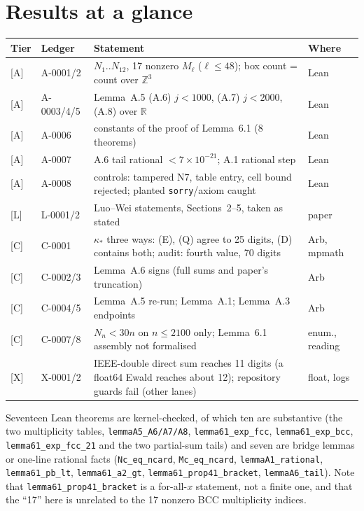 \documentclass[11pt]{article}
\newcommand{\tier}[1]{\textsf{[#1]}}
\newcommand{\tA}{\tier{A}}
\newcommand{\tL}{\tier{L}}
\newcommand{\tC}{\tier{C}}
\newcommand{\tX}{\tier{X}}
\newcommand{\lean}[1]{\texttt{#1}}
\newcommand{\ks}{\kappa_*}
\begin{document}
\section{Results at a glance}\label{sec:results}
\begin{table}[h]\centering\small
\begin{tabular}{@{}llp{8.4cm}l@{}}\toprule
Tier & Ledger & Statement & Where\\\midrule
\tA & A-0001/2 & $N_1..N_{12}$, 17 nonzero $M_\ell$ ($\ell\le48$); box count = count over $\mathbb Z^3$ & Lean\\
\tA & A-0003/4/5 & Lemma~A.5 (A.6) $j<1000$, (A.7) $j<2000$, (A.8) over $\mathbb R$ & Lean\\
\tA & A-0006 & constants of the proof of Lemma~6.1 (8 theorems) & Lean\\
\tA & A-0007 & A.6 tail rational $<7\times10^{-21}$; A.1 rational step & Lean\\
\tA & A-0008 & controls: tampered N7, table entry, cell bound rejected; planted \lean{sorry}/axiom caught & Lean\\
\tL & L-0001/2 & Luo--Wei statements, Sections~2--5, taken as stated & paper\\
\tC & C-0001 & $\ks$ three ways: (E), (Q) agree to 25 digits, (D) contains both; audit: fourth value, 70 digits & Arb, mpmath\\
\tC & C-0002/3 & Lemma~A.6 signs (full sums and paper's truncation) & Arb\\
\tC & C-0004/5 & Lemma~A.5 re-run; Lemma~A.1; Lemma~A.3 endpoints & Arb\\
\tC & C-0007/8 & $N_n<30n$ on $n\le2100$ only; Lemma~6.1 assembly not formalised & enum., reading\\
\tX & X-0001/2 & IEEE-double direct sum reaches 11 digits (a float64 Ewald reaches about 12); repository guards fail (other lanes) & float, logs\\\bottomrule
\end{tabular}
\end{table}
Seventeen Lean theorems are kernel-checked, of which ten are substantive (the two multiplicity tables, \lean{lemmaA5\_A6/A7/A8}, \lean{lemma61\_exp\_fcc}, \lean{lemma61\_exp\_bcc}, \lean{lemma61\_exp\_fcc\_21} and the two partial-sum tails) and seven are bridge lemmas or one-line rational facts
(\lean{Nc\_eq\_ncard}, \lean{Mc\_eq\_ncard}, \lean{lemmaA1\_rational}, \lean{lemma61\_pb\_lt}, \lean{lemma61\_a2\_gt}, \lean{lemma61\_prop41\_bracket}, \lean{lemmaA6\_tail}). Note that \lean{lemma61\_prop41\_bracket} is a for-all-$x$ statement, not a finite one, and that the ``17'' here is unrelated to the 17 nonzero BCC multiplicity indices.
\end{document}
